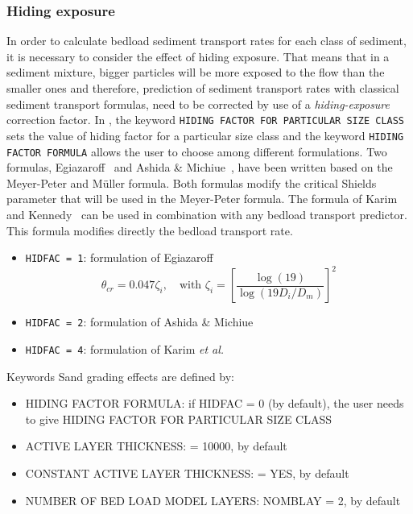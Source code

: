 \subsubsection{Hiding exposure}
In order to calculate bedload sediment transport rates for each class of
sediment, it is necessary to consider the effect of
hiding exposure. That means that in a sediment mixture, bigger particles will be more exposed to the
flow than the smaller ones and therefore, prediction of sediment transport rates with classical sediment transport
formulas, need to be corrected by use of a \emph{hiding-exposure} correction factor. In \sisyphe, 
the keyword \texttt{HIDING FACTOR FOR PARTICULAR SIZE CLASS} sets the value of hiding factor for a particular size class and the keyword \texttt{HIDING FACTOR FORMULA} allows the user to choose among different formulations. Two formulas, Egiazaroff~\cite{Egiazaroff} and Ashida \& Michiue~\cite{Ashida}, have been written
based on the Meyer-Peter and M\"{u}ller formula. Both formulas modify the critical Shields parameter that will be
used in the Meyer-Peter formula. The formula of Karim and Kennedy~\cite{Karim} can be used in combination with any bedload transport predictor. This formula modifies directly the bedload transport rate.

\begin{itemize}

\item \texttt{HIDFAC = 1}: formulation of Egiazaroff 
\begin{equation*}
\theta_{cr} = 0.047\zeta_i,\quad\text{with}\,\, \zeta_i = \left[\frac{\log (19)}{\log (19 D_i /D_m)} \right]^2 
\end{equation*}
\item \texttt{HIDFAC = 2}: formulation of Ashida \& Michiue 

\item \texttt{HIDFAC = 4}: formulation of Karim \emph{et al.}

\end{itemize}

\medskip
\begin{bclogo}[couleur=blue!10,arrondi=0.1, logo=\bcinfo]{Keywords}
Sand grading effects are defined by:
\begin{itemize}
\item {\ttfamily HIDING FACTOR FORMULA}: if {\ttfamily HIDFAC = 0} (by default), the user needs to give {\ttfamily HIDING FACTOR FOR PARTICULAR SIZE CLASS}
\item {\ttfamily ACTIVE LAYER THICKNESS}: {\ttfamily = 10000}, by default 
\item {\ttfamily CONSTANT ACTIVE LAYER THICKNESS}: {\ttfamily = YES}, by
default
\item {\ttfamily NUMBER OF BED LOAD MODEL LAYERS}: {\ttfamily NOMBLAY = 2}, by
default
\end{itemize}
\end{bclogo}

